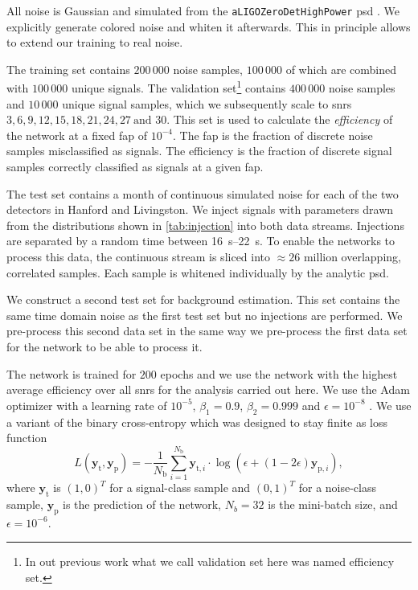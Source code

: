 All noise is Gaussian and simulated from the \verb|aLIGOZeroDetHighPower| \acrshort{psd} \cite{lalsuite}. We explicitly generate colored noise and whiten it afterwards. This in principle allows to extend our training to real noise.

The training set contains $200\,000$ noise samples, $100\,000$ of which are combined with $100\,000$ unique signals. The validation set\footnote{In out previous work \cite{Schafer:2021fea} what we call validation set here was named efficiency set.} contains $400\,000$ noise samples and $10\,000$ unique signal samples, which we subsequently scale to \acrshort{snr}s $3, 6, 9, 12, 15, 18, 21, 24, 27\ \text{and } 30$. This set is used to calculate the \textit{efficiency} of the network at a fixed \acrfull{fap} of $10^{-4}$. The \acrshort{fap} is the fraction of discrete noise samples misclassified as signals. The efficiency is the fraction of discrete signal samples correctly classified as signals at a given \acrshort{fap}.

The test set contains a month of continuous simulated noise for each of the two detectors in Hanford and Livingston. We inject signals with parameters drawn from the distributions shown in \autoref{tab:injection} into both data streams. Injections are separated by a random time between \SIrange{16}{22}{\second}. To enable the networks to process this data, the continuous stream is sliced into $\approx 26$ million overlapping, correlated samples. Each sample is whitened individually by the analytic \acrshort{psd}.

We construct a second test set for background estimation. This set contains the same time domain noise as the first test set but no injections are performed. We pre-process this second data set in the same way we pre-process the first data set for the network to be able to process it.

The network is trained for $200$ epochs and we use the network with the highest average efficiency over all \acrshort{snr}s for the analysis carried out here. We use the Adam optimizer with a learning rate of $10^{-5}$, $\beta_1=0.9$, $\beta_2=0.999$ and $\epsilon=10^{-8}$ \cite{Kingma:2014aaa}. We use a variant of the binary cross-entropy which was designed to stay finite as loss function
\begin{equation}
    L(\bm{y}_\text{t}, \bm{y}_\text{p}) = -\frac{1}{N_\text{b}}\sum_{i=1}^{N_\text{b}} \bm{y}_{\text{t},i}\cdot\log\left(\epsilon + (1 - 2 \epsilon) \bm{y}_{\text{p},i}\right),
\end{equation}
where $\bm{y}_\text{t}$ is ${\left(1,0\right)}^T$ for a signal-class sample and ${\left(0,1\right)}^T$ for a noise-class sample, $\bm{y}_\text{p}$ is the prediction of the network, $N_b=32$ is the mini-batch size, and $\epsilon=10^{-6}$.


